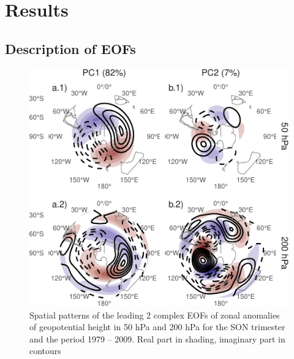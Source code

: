 \documentclass[smallextended]{svjour3}       %
\begin{document}
\hypertarget{results}{%
\section{Results}\label{results}}

\hypertarget{description-of-eofs}{%
\subsection{Description of EOFs}\label{description-of-eofs}}

\begin{figure}
\centering
\includegraphics{../figures/ceofs-1-1.pdf}
\caption{\label{fig:ceofs-1}Spatial patterns of the leading 2 complex EOFs of zonal anomalies of geopotential height in 50 hPa and 200 hPa for the SON trimester and the period 1979 -- 2009. Real part in shading, imaginary part in contours}
\end{figure}
\end{document}
